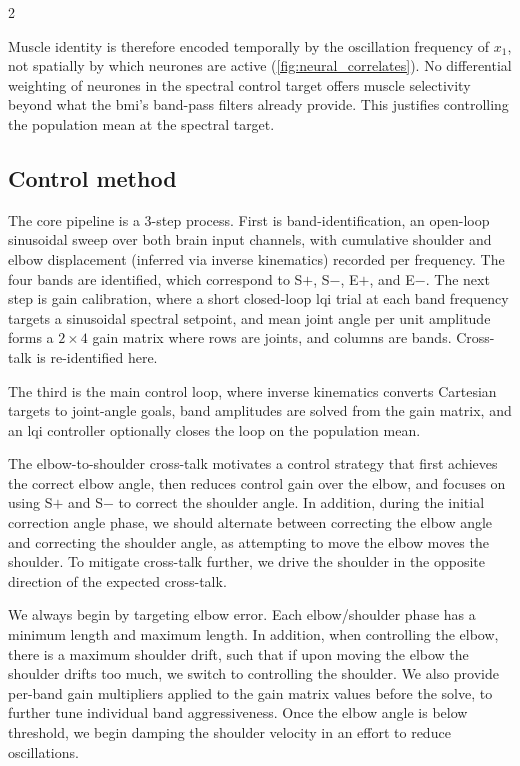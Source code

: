 \documentclass[a4paper, 10pt]{article}
\newcommand{\BMI}{\ac{bmi}\xspace}
\newcommand{\LQI}{\ac{lqi}\xspace}
\begin{document}
\begin{multicols*}{2}

  Muscle identity is therefore encoded temporally by the oscillation frequency
  of $x_1$, not spatially by which neurones are active (\autoref{fig:neural_correlates}).
  No differential weighting of neurones in the spectral control target offers
  muscle selectivity beyond what the \BMI's band-pass filters already provide.
  This justifies controlling the population mean at the spectral target.

  \subsection*{Control method}

  The core pipeline is a 3-step process. First is band-identification, an
  open-loop sinusoidal sweep over both brain input channels, with cumulative
  shoulder and elbow displacement (inferred via inverse kinematics) recorded per
  frequency. The four bands are identified, which correspond to S$+$, S$-$,
  E$+$, and E$-$. The next step is gain calibration, where a short closed-loop
  \LQI trial at each band frequency targets a sinusoidal spectral setpoint, and
  mean joint angle per unit amplitude forms a $2\times4$ gain matrix where rows
  are joints, and columns are bands. Cross-talk is re-identified here.


  The third is the main control loop, where
  inverse kinematics converts Cartesian targets to joint-angle goals, band
  amplitudes are solved from the gain matrix, and an \LQI controller optionally
  closes the loop on the population mean.

  The elbow-to-shoulder cross-talk motivates a control strategy that first
  achieves the correct elbow angle, then reduces control gain over the elbow, and
  focuses on using S$+$ and S$-$ to correct the shoulder angle. In addition, during the
  initial correction angle phase, we should alternate between correcting the
  elbow angle and correcting the shoulder angle, as attempting to move the elbow
  moves the shoulder. To mitigate cross-talk further, we drive the shoulder in
  the opposite direction of the expected cross-talk.

  We always begin by targeting elbow error. Each elbow/shoulder phase
  has a minimum length and maximum length. In addition, when controlling the
  elbow, there is a maximum shoulder drift, such that if upon moving the elbow
  the shoulder drifts too much, we switch to controlling the shoulder. We also
  provide per-band gain multipliers applied to the gain matrix values before the
  solve, to further tune individual band aggressiveness. Once the elbow angle is
  below threshold, we begin damping the shoulder velocity in an effort to reduce
  oscillations.


\end{multicols*}
\end{document}
